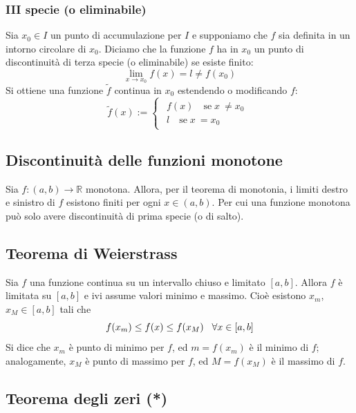 \documentclass[12pt]{article}
\begin{document}
\subsubsection{III specie (o eliminabile)}
Sia $x_0 \in I$ un punto di accumulazione per $I$
e supponiamo che $f$ sia definita in un intorno
circolare di $x_0$. Diciamo che la funzione $f$ ha
in $x_0$ un punto di discontinuità di terza specie
(o eliminabile) se esiste finito:
\[  \lim_{x \to x_0} f(x) = l \neq f(x_0) \]
Si ottiene una funzione $\tilde{f}$ continua in $x_0$
estendendo o modificando $f$:
\[ \tilde{f}(x) := \begin{cases} \begin{aligned}
f(x)\quad \text{se} \; x\ \neq x_0 \\
l\quad \text{se} \; x\ = x_0
\end{aligned}  \end{cases} \]


\subsection{Discontinuità delle funzioni monotone}
Sia $f: (a, b) \to \mathbb{R}$ monotona. Allora,
per il teorema di monotonia,
i limiti destro e sinistro di $f$
esistono finiti per ogni $x \in (a,b)$.
Per cui una funzione monotona
può solo avere discontinuità
di prima specie (o di salto).

\subsection{Teorema di Weierstrass}
Sia $f$ una funzione continua su un intervallo
chiuso e limitato $[a,b]$. Allora $f$ è limitata
su $[a,b]$ e ivi assume valori minimo e massimo.
Cioè esistono $x_m$,$x_M \in [a,b]$ tali che
\[ f(x_m) \leq f(x) \leq f(x_M) \hspace{0.3cm} \forall x \in [a,b]\]
Si dice che $x_m$ è punto di minimo per $f$,
ed $m = f(x_m)$ è il minimo di $f$;
analogamente, $x_M$ è punto di massimo per $f$,
ed $M = f(x_M)$ è il massimo di $f$.

\subsection{Teorema degli zeri (*)}
\end{document}
